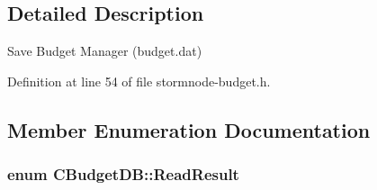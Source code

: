 \subsection{Detailed Description}
Save Budget Manager (budget.\+dat) 

Definition at line 54 of file stormnode-\/budget.\+h.



\subsection{Member Enumeration Documentation}
\hypertarget{class_c_budget_d_b_a53586703b6648c7cabbf9cdcfef5f7d9}{}
\subsubsection[{Read\+Result}]{\setlength{\rightskip}{0pt plus 5cm}enum {\bf C\+Budget\+D\+B\+::\+Read\+Result}}\label{class_c_budget_d_b_a53586703b6648c7cabbf9cdcfef5f7d9}
